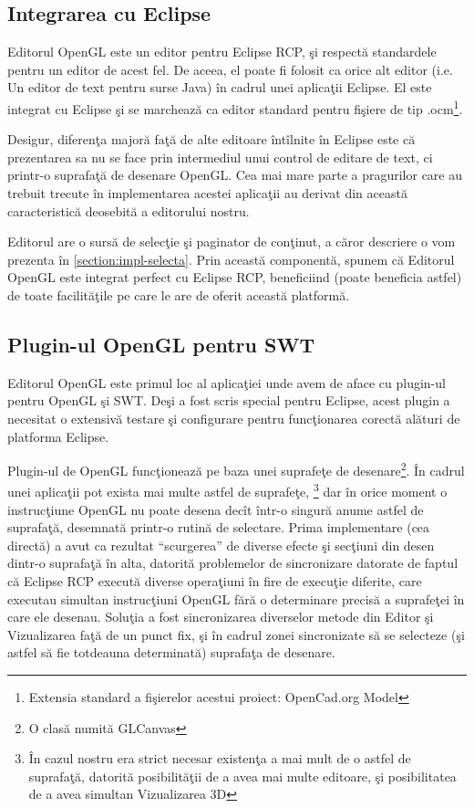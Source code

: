 \subsection{Integrarea cu Eclipse}
Editorul OpenGL este un editor pentru Eclipse RCP, şi respectă standardele
pentru un editor de acest fel. De aceea, el poate fi folosit ca orice alt editor
(i.e. Un editor de text pentru surse Java) în cadrul unei aplicaţii Eclipse. El
este integrat cu Eclipse şi se marchează ca editor standard pentru fişiere de
tip .ocm\footnote{Extensia standard a fişierelor acestui proiect: OpenCad.org
Model}.

Desigur, diferenţa majoră faţă de alte editoare întîlnite în Eclipse este că
prezentarea sa nu se face prin intermediul unui control de editare de text, ci
printr-o suprafaţă de desenare OpenGL. Cea mai mare parte a pragurilor care au
trebuit trecute în implementarea acestei aplicaţii au derivat din această
caracteristică deosebită a editorului nostru.

Editorul are o sursă de selecţie şi paginator de conţinut, a căror descriere o
vom prezenta în \ref{section:impl-selecta}. Prin această componentă, spunem că
Editorul OpenGL este integrat perfect cu Eclipse RCP, beneficiind (poate
beneficia astfel) de toate facilităţile pe care le are de oferit această
platformă.

\subsection{Plugin-ul OpenGL pentru SWT}
Editorul OpenGL este primul loc al aplicaţiei unde avem de aface cu plugin-ul
pentru OpenGL şi SWT. Deşi a fost scris special pentru Eclipse, acest plugin a
necesitat o extensivă testare şi configurare pentru funcţionarea corectă alături
de platforma Eclipse.

Plugin-ul de OpenGL funcţionează pe baza unei suprafeţe de desenare\footnote{O 
clasă numită GLCanvas}. În cadrul unei aplicaţii pot exista mai multe astfel de 
suprafeţe, \footnote{În cazul nostru era strict necesar existenţa a mai mult de 
o astfel de suprafaţă, datorită posibilităţii de a avea mai multe editoare, şi 
posibilitatea de a avea simultan Vizualizarea 3D} dar în orice moment o 
instrucţiune OpenGL nu poate desena decît într-o singură anume astfel de 
suprafaţă, desemnată printr-o rutină de selectare. Prima implementare (cea 
directă) a avut ca rezultat ``scurgerea'' de diverse efecte şi secţiuni din 
desen dintr-o suprafaţă în alta, datorită problemelor de sincronizare datorate 
de faptul că Eclipse RCP execută diverse operaţiuni în fire de execuţie 
diferite, care executau simultan instrucţiuni OpenGL fără o determinare precisă 
a suprafeţei în care ele desenau. Soluţia a fost sincronizarea diverselor 
metode din Editor şi Vizualizarea faţă de un punct fix, şi în cadrul zonei 
sincronizate să se selecteze (şi astfel să fie totdeauna determinată) suprafaţa 
de desenare.

